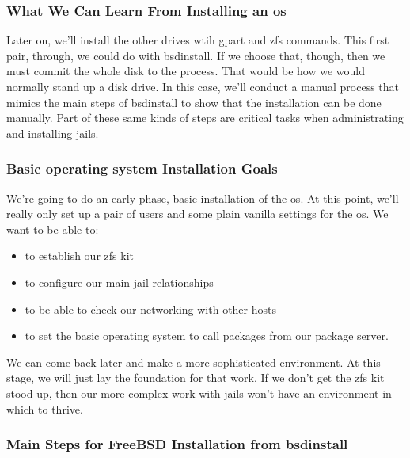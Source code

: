\subsubsection{What We Can Learn From Installing an \gls{os}}
Later on, we'll install the other drives wtih gpart and \gls{zfs} commands.  This first pair, through, we could do with bsdinstall.  If we choose that, though, then we must commit the whole disk to the process.  That would be how we would normally stand up a disk drive.  In this case, we'll conduct a manual process that mimics the main steps of bsdinstall to show that the installation can be done manually.  Part of these same kinds of steps are critical tasks when administrating and installing jails.

\subsubsection{Basic  \Gls{operating system} Installation Goals}
We're going to do an early phase, basic installation of the \gls{os}.  At this point, we'll really only set up a pair of users and some plain vanilla settings for the \gls{os}.  We want to be able to:
\begin{itemize}
\item to establish our \gls{zfs} kit
\item to configure our main \gls{jail} relationships
\item to be able to check our networking with other hosts
\item to set the basic  \gls{operating system} to call packages from our package server.
\end{itemize}
We can come back later and make a more sophisticated environment.  At this stage, we will just lay the foundation for that work.  If we don't get the \gls{zfs} kit stood up, then our more complex work with jails won't have an environment in which to thrive.


\subsubsection{Main Steps for FreeBSD Installation from bsdinstall}
\protect{}

